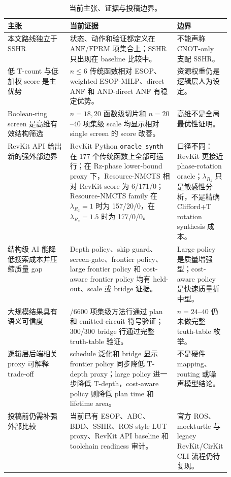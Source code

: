 \documentclass[UTF8,fontset=macnew,11pt]{ctexart}
\newcommand{\method}{Resource-NMCTS}
\newcommand{\screen}{Boolean-ring screen}
\newcommand{\anf}{\ensuremath{\mathrm{ANF}}}
\newcommand{\fprm}{\ensuremath{\mathrm{FPRM}}}
\newcommand{\ttable}{truth-table}
\begin{document}
\begin{table}[H]
\centering
\small
\caption{当前主张、证据与投稿边界。}
\label{tab:evidence-map}
\begin{tabularx}{\linewidth}{>{\raggedright\arraybackslash}p{0.28\linewidth}>{\raggedright\arraybackslash}X>{\raggedright\arraybackslash}p{0.23\linewidth}}
\toprule
主张 & 当前证据 & 边界 \\
\midrule
本文路线独立于 SSHR & 状态、动作和验证都定义在 \anf{}/\fprm{} 项集合上；SSHR 只出现在 baseline 比较中。 & 不能声称 CNOT-only 支配 SSHR。 \\
低 T-count 与低加权 score 是主优势 & $n\leq6$ 传统函数相对 ESOP、weighted ESOP-MILP、direct ANF 和 AND-direct ANF 有稳定优势。 & 资源权重仍是逻辑层人为设定。 \\
\screen{} 是高维有效结构筛选 & $n=18,20$ 函数级切片和 $n=20$--$40$ 项集级 scale 均显示相对 single screen 的 score 改善。 & 高维不是全局最优性证明。 \\
RevKit API 给出新的强外部边界 & RevKit Python \texttt{oracle\_synth} 在 177 个传统函数上全部可运行；在 Rz-phase lower-bound proxy 下，\method{} 相对 RevKit score 为 6/171/0；Resource-NMCTS family 在 $\lambda_{R_z}=1$ 时为 157/20/0，在 $\lambda_{R_z}=1.5$ 时为 177/0/0。 & 口径不同：RevKit 更接近 phase-rotation oracle；$\lambda_{R_z}$ 只是敏感性分析，不是精确 Clifford+T rotation synthesis 成本。 \\
结构级 AI 能降低搜索成本并压缩质量 gap & Depth policy、skip guard、screen-gate、frontier policy、large frontier policy 和 cost-aware frontier policy 均有 held-out、scale 或 bridge 证据。 & Large policy 是质量增强型；cost-aware policy 是快速质量折中型。 \\
大规模结果具有语义可信度 & 6600/6600 项集级方法行通过 plan 和 emitted-circuit 符号验证；300/300 bridge 行通过完整 \ttable{} 验证。 & $n=24$--$40$ 仍未做完整 \ttable{} 枚举。 \\
逻辑层后端相关 proxy 可解释 trade-off & schedule 泛化和 bridge 显示 frontier policy 同步降低 T-depth proxy；large policy 进一步降低 T-depth，cost-aware policy 则降低 plan time 和 lifetime area。 & 不是硬件 mapping、routing 或噪声模型结论。 \\
投稿前仍需补强外部比较 & 当前已有 ESOP、ABC、BDD、SSHR、ROS-style LUT proxy、RevKit API baseline 和 toolchain readiness 审计。 & 官方 ROS、mockturtle 与 legacy RevKit/CirKit CLI 流程仍待复现。 \\
\bottomrule
\end{tabularx}
\end{table}
\end{document}
